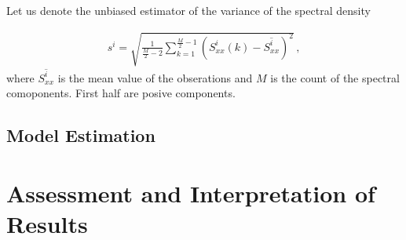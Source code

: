 Let us denote the unbiased estimator of the variance of the spectral density

\begin{equation}\label{eq:sdev}
\begin{split}
s^i = \sqrt{ \frac{1}{\frac{M}{2}-2} \sum_{k=1}^{\frac{M}{2}-1} \left( S_{xx}^i\left(k\right) - 
\overline{S_{xx}^i} \right)^2 }  \, , 
\end{split}
\end{equation}
where $\overline{S_{xx}^i} $ is the mean value of the obserations and $M$ is the
count of the spectral comoponents. First half are posive components.



\subsection{Model Estimation}

\section{Assessment and Interpretation of Results}
